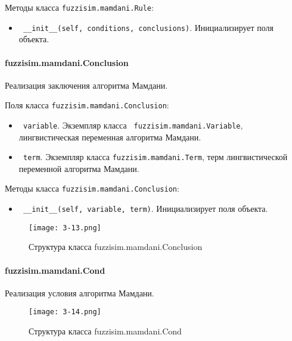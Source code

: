 Методы класса \lstinline!fuzzisim.mamdani.Rule!:
\begin{itemize}
	\item \lstinline! __init__(self, conditions, conclusions)!. Инициализирует поля объекта.
\end{itemize}



\paragraph{fuzzisim.mamdani.Conclusion}

Реализация заключения алгоритма Мамдани.

Поля класса \lstinline!fuzzisim.mamdani.Conclusion!:
\begin{itemize}
	\item \lstinline! variable!. Экземпляр класса \lstinline! fuzzisim.mamdani.Variable!, лингвистическая переменная алгоритма Мамдани.
	\item \lstinline! term!.   Экземпляр класса  \lstinline!fuzzisim.mamdani.Term!, терм лингвистической переменной алгоритма Мамдани.
\end{itemize}


Методы класса \lstinline!fuzzisim.mamdani.Conclusion!:
\begin{itemize}
	\item \lstinline! __init__(self, variable, term)!. Инициализирует поля объекта.
\end{itemize}


\begin{figure}[ht]
	\centering
	\texttt{[image: 3-13.png]}
	\caption{ Структура класса fuzzisim.mamdani.Conclusion}
\end{figure}


\paragraph{fuzzisim.mamdani.Cond}

Реализация условия алгоритма Мамдани.

\begin{figure}[ht]
	\centering
	\texttt{[image: 3-14.png]}
	\caption{ Структура класса fuzzisim.mamdani.Cond}
\end{figure}

